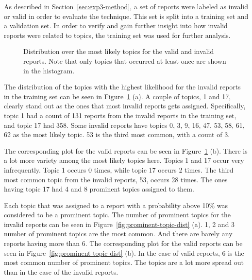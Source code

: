 As described in Section~\ref{sec:exp3-method}, a set of reports were labeled as invalid or valid in order to evaluate the technique.
This set is split into a training set and a validation set.
In order to verify and gain further insight into how invalid reports were related to topics, the training set was used for further analysis.

\begin{figure}[h!]
    \centering
    \caption{Distribution over the most likely topics for the valid and invalid reports. Note that only topics that occurred at least once are shown in the histogram.}
    \label{fig:most-likely-topics}
\end{figure}

The distribution of the topics with the highest likelihood for the invalid reports in the training set can be seen in Figure~\ref{fig:most-likely-topics} (a).
A couple of topics, 1 and 17, clearly stand out as the ones that most invalid reports gets assigned.
Specifically, topic 1 had a count of 131 reports from the invalid reports in the training set, and topic 17 had 358.
Some invalid reports have topics 0, 3, 9, 16, 47, 53, 58, 61, 62 as the most likely topic.
53 is the third most common, with a count of 3.

The corresponding plot for the valid reports can be seen in Figure~\ref{fig:most-likely-topics} (b).
There is a lot more variety among the most likely topics here.
Topics 1 and 17 occur very infrequently.
Topic 1 occurs 0 times, while topic 17 occurs 2 times.
The third most common topic from the invalid reports, 53, occurs 28 times.
The ones having topic 17 had 4 and 8 prominent topics assigned to them.

Each topic that was assigned to a report with a probability above 10\% was considered to be a prominent topic.
The number of prominent topics for the invalid reports can be seen in Figure~\ref{fig:prominent-topic-dist} (a).
1, 2 and 3 number of prominent topics are the most common.
And there are barely any reports having more than 6.
The corresponding plot for the valid reports can be seen in Figure~\ref{fig:prominent-topic-dist} (b).
In the case of valid reports, 6 is the most common number of prominent topics. 
The topics are a lot more spread out than in the case of the invalid reports.

